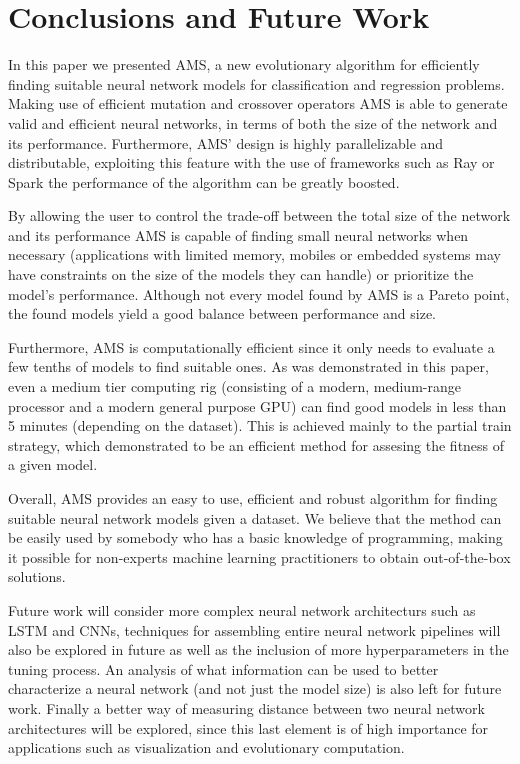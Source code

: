 \documentclass[journal]{IEEEtran}
\begin{document}
\section{Conclusions and Future Work}
\label{sec:conclusions}

In this paper we presented AMS, a new evolutionary algorithm for efficiently finding suitable neural network models for classification and regression problems. Making use of efficient mutation and crossover operators AMS is able to generate valid and efficient neural networks, in terms of both the size of the network and its performance. Furthermore, AMS' design is highly parallelizable and distributable, exploiting this feature with the use of frameworks such as Ray \cite{Moritz2017} or Spark \cite{Zaharia2010} the performance of the algorithm can be greatly boosted.

By allowing the user to control the trade-off between the total size of the network and its performance AMS is capable of finding small neural networks when necessary (applications with limited memory, mobiles or embedded systems may have constraints on the size of the models they can handle) or prioritize the model's performance. Although not every model found by AMS is a Pareto point, the found models yield a good balance between performance and size.

Furthermore, AMS is computationally efficient since it only needs to evaluate a few tenths of models to find suitable ones. As was demonstrated in this paper, even a medium tier computing rig (consisting of a modern, medium-range processor and a modern general purpose GPU) can find good models in less than 5 minutes (depending on the dataset). This is achieved mainly to the partial train strategy, which demonstrated to be an efficient method for assesing the fitness of a given model.

Overall, AMS provides an easy to use, efficient and robust algorithm for finding suitable neural network models given a dataset. We believe that the method can be easily used by somebody who has a basic knowledge of programming, making it possible for non-experts machine learning practitioners to obtain out-of-the-box solutions.

Future work will consider more complex neural network architecturs such as LSTM and CNNs, techniques for assembling entire neural network pipelines will also be explored in future as well as the inclusion of more hyperparameters in the tuning process. An analysis of what information can be used to better characterize a neural network (and not just the model size) is also left for future work. Finally a better way of measuring distance between two neural network architectures will be explored, since this last element is of high importance for applications such as visualization and evolutionary computation.
\end{document}

